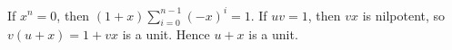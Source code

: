 If $x^n=0$, then $(1+x)\sum_{i=0}^{n-1}(-x)^i=1$. If $uv=1$, then $vx$ is nilpotent, so $v(u+x)=1+vx$ is a unit. Hence $u+x$ is a unit.
